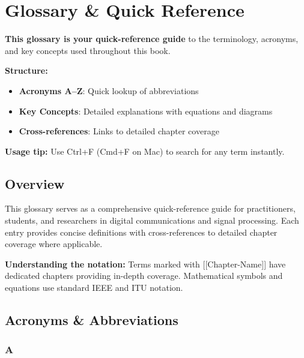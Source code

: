 \chapter{Glossary \& Quick Reference}\label{ch:glossary}

\begin{nontechnical}
\textbf{This glossary is your quick-reference guide} to the terminology, acronyms, and key concepts used throughout this book.

\textbf{Structure:}
\begin{itemize}
\item \textbf{Acronyms A--Z}: Quick lookup of abbreviations
\item \textbf{Key Concepts}: Detailed explanations with equations and diagrams
\item \textbf{Cross-references}: Links to detailed chapter coverage
\end{itemize}

\textbf{Usage tip:} Use Ctrl+F (Cmd+F on Mac) to search for any term instantly.
\end{nontechnical}

\section{Overview}

This glossary serves as a comprehensive quick-reference guide for practitioners, students, and researchers in digital communications and signal processing. Each entry provides concise definitions with cross-references to detailed chapter coverage where applicable.

\begin{keyconcept}
\textbf{Understanding the notation:} Terms marked with {[}{[}Chapter-Name{]}{]} have dedicated chapters providing in-depth coverage. Mathematical symbols and equations use standard IEEE and ITU notation.
\end{keyconcept}

\section{Acronyms \& Abbreviations}

\subsection{A}\label{sec:acronyms-a}

